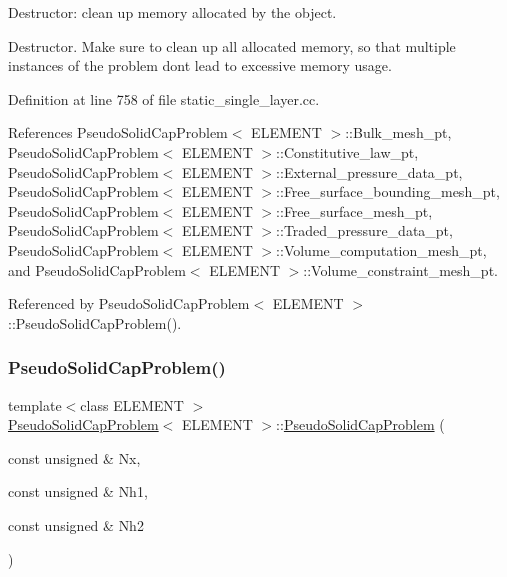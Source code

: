 Destructor\+: clean up memory allocated by the object. 

Destructor. Make sure to clean up all allocated memory, so that multiple instances of the problem don\textquotesingle{}t lead to excessive memory usage. 

Definition at line 758 of file static\+\_\+single\+\_\+layer.\+cc.



References Pseudo\+Solid\+Cap\+Problem$<$ E\+L\+E\+M\+E\+N\+T $>$\+::\+Bulk\+\_\+mesh\+\_\+pt, Pseudo\+Solid\+Cap\+Problem$<$ E\+L\+E\+M\+E\+N\+T $>$\+::\+Constitutive\+\_\+law\+\_\+pt, Pseudo\+Solid\+Cap\+Problem$<$ E\+L\+E\+M\+E\+N\+T $>$\+::\+External\+\_\+pressure\+\_\+data\+\_\+pt, Pseudo\+Solid\+Cap\+Problem$<$ E\+L\+E\+M\+E\+N\+T $>$\+::\+Free\+\_\+surface\+\_\+bounding\+\_\+mesh\+\_\+pt, Pseudo\+Solid\+Cap\+Problem$<$ E\+L\+E\+M\+E\+N\+T $>$\+::\+Free\+\_\+surface\+\_\+mesh\+\_\+pt, Pseudo\+Solid\+Cap\+Problem$<$ E\+L\+E\+M\+E\+N\+T $>$\+::\+Traded\+\_\+pressure\+\_\+data\+\_\+pt, Pseudo\+Solid\+Cap\+Problem$<$ E\+L\+E\+M\+E\+N\+T $>$\+::\+Volume\+\_\+computation\+\_\+mesh\+\_\+pt, and Pseudo\+Solid\+Cap\+Problem$<$ E\+L\+E\+M\+E\+N\+T $>$\+::\+Volume\+\_\+constraint\+\_\+mesh\+\_\+pt.



Referenced by Pseudo\+Solid\+Cap\+Problem$<$ E\+L\+E\+M\+E\+N\+T $>$\+::\+Pseudo\+Solid\+Cap\+Problem().

\mbox{\label{classPseudoSolidCapProblem_a4e8963d64b50a96902169838cc195903}} 
\subsubsection{\texorpdfstring{Pseudo\+Solid\+Cap\+Problem()}{PseudoSolidCapProblem()}\hspace{0.1cm}{\footnotesize\ttfamily [2/2]}}
{\footnotesize\ttfamily template$<$class E\+L\+E\+M\+E\+NT $>$ \\
\hyperlink{classPseudoSolidCapProblem}{Pseudo\+Solid\+Cap\+Problem}$<$ E\+L\+E\+M\+E\+NT $>$\+::\hyperlink{classPseudoSolidCapProblem}{Pseudo\+Solid\+Cap\+Problem} (\begin{DoxyParamCaption}\item[{const unsigned \&}]{Nx,  }\item[{const unsigned \&}]{Nh1,  }\item[{const unsigned \&}]{Nh2 }\end{DoxyParamCaption})}

